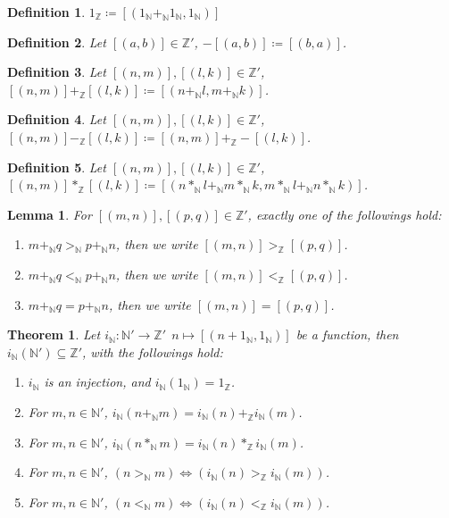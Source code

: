\documentclass[11pt]{article}
\theoremstyle{break}
\theoremstyle{break}
\newtheorem{thm}{Theorem}[section]
\newtheorem{lem}{Lemma}[thm]
\newtheorem{defn}{Definition}[corL]
\newcommand{\N}{\mathbb{N}}
\newcommand{\Z}{\mathbb{Z}}
\begin{document}
	\begin{defn}
		$1_{\Z} \coloneqq [(1_\N +_{\N} 1_\N,1_\N)]$
	\end{defn}
	
	\begin{defn}
		Let $[(a,b)] \in \Z'$, $-[(a,b)] \coloneqq [(b,a)]$.
	\end{defn}
	
	\begin{defn}
		Let $[(n,m)],[(l,k)] \in \Z'$, $[(n,m)] +_{\Z} [(l,k)] \coloneqq [(n +_{\N} l, m +_{\N} k)]$.
	\end{defn}

	\begin{defn}
		Let $[(n,m)],[(l,k)] \in \Z'$, $[(n,m)] -_{\Z} [(l,k)] \coloneqq [(n,m)] +_{\Z}  -[(l,k)]$.
	\end{defn}
	
	\begin{defn}
		Let $[(n,m)],[(l,k)] \in \Z'$, $[(n,m)] \ast_{\Z} [(l,k)] \coloneqq [(n \ast_{\N} l +_{\N} m \ast_{\N} k , m \ast_{\N} l +_{\N} n \ast_{\N} k)]$.
	\end{defn}
\clearpage
	\begin{lem}
		For $[(m,n)],[(p,q)] \in \Z'$, exactly one of the followings hold:
		\begin{enumerate}[topsep=3pt,itemsep=-1ex,partopsep=1ex,parsep=1ex]
			\item $m +_{\N} q >_{\N} p +_{\N} n$, then we write $[(m,n)] >_{\Z} [(p,q)]$.
			\item $m +_{\N} q <_{\N} p +_{\N} n$, then we write $[(m,n)] <_{\Z} [(p,q)]$.
			\item $m +_{\N} q = p +_{\N} n$, then we write $[(m,n)] = [(p,q)]$.
		\end{enumerate}
	\end{lem}
	
	\begin{thm}
		Let $i_{\N}:\N' \to \Z' \ \ n \mapsto [(n+1_\N,1_\N)]$ be a function, then $i_{\N}(\N') \subseteq \Z'$, with the followings hold:
		\begin{enumerate}[topsep=3pt,itemsep=-1ex,partopsep=1ex,parsep=1ex]
			\item $i_{\N}$ is an injection, and $i_{\N}(1_{\N})=1_{\Z}$.
			\item For $m,n \in \N'$, $i_{\N}(n +_{\N} m) = i_{\N}(n) +_{\Z} i_{\N}(m)$.
			\item For $m,n \in \N'$, $i_{\N}(n \ast_{\N} m) = i_{\N}(n) \ast_{\Z} i_{\N}(m)$.
			\item For $m,n \in \N'$, $(n >_{\N} m)\iff(i_{\N}(n) >_{\Z} i_{\N}(m))$.
			\item For $m,n \in \N'$, $(n <_{\N} m)\iff(i_{\N}(n) <_{\Z} i_{\N}(m))$.
		\end{enumerate}
	\end{thm}
	
\end{document}
